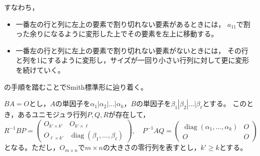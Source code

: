 \documentclass[uplatex]{jsarticle}
\DeclareMathOperator{\diag}{diag}
\begin{document}
すなわち，
\begin{itemize}
  \item 一番左の行と列に左上の要素で割り切れない要素があるときには，
  $a_{11}$で割った余りになるように変形した上でその要素を左上に移動する。
  \item 一番左の行と列に左上の要素で割り切れない要素がないときには，
  その行と列を1にするように変形し，サイズが一回り小さい行列に対して更に変形を続けていく。
\end{itemize}
の手順を踏むことでSmith標準形に辿り着く。

\begin{hodai}
  $BA = O$とし，$A$の単因子を$\alpha_{1} | \alpha_{2} | \dots | \alpha_{k}$，$B$の単因子を$\beta_{1} | \beta_{2} | \dots | \beta_{\ell}$とする。
  このとき，あるユニモジュラ行列$P,Q,R$が存在して，
  \begin{equation}
    R^{-1} B P = \begin{pmatrix}
      O_{k' \times k'} & O_{k' \times \ell} \\ O_{\ell \times k'} & \diag (\beta_{1}, \dots, \beta_{\ell})
    \end{pmatrix}, \quad
    P^{-1} A Q = \begin{pmatrix}
      \diag (\alpha_{1}, \dots, \alpha_{k}) & O \\ O & O
    \end{pmatrix}
  \end{equation}
  となる。ただし，$O_{m \times n}$で$m \times n$の大きさの零行列を表すとし，$k' \ge k$とする。
\end{hodai}
\end{document}

